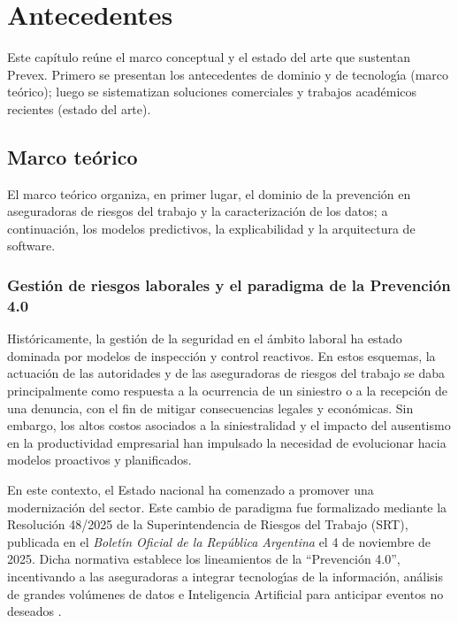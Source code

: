 \chapter{Antecedentes}\label{ch:antecedentes}\label{ch:marco-teorico}

Este cap\'itulo re\'une el marco conceptual y el estado del arte que sustentan Prevex. Primero se presentan los antecedentes de dominio y de tecnolog\'{\i}a (marco te\'orico); luego se sistematizan soluciones comerciales y trabajos acad\'emicos recientes (estado del arte).

\section{Marco te\'orico}\label{sec:marco-teorico}

El marco te\'orico organiza, en primer lugar, el dominio de la prevenci\'on en aseguradoras de riesgos del trabajo y la caracterizaci\'on de los datos; a continuaci\'on, los modelos predictivos, la explicabilidad y la arquitectura de software.

\subsection{Gesti\'on de riesgos laborales y el paradigma de la Prevenci\'on 4.0}

Hist\'oricamente, la gesti\'on de la seguridad en el \'ambito laboral ha estado dominada por modelos de inspecci\'on y control reactivos. En estos esquemas, la actuaci\'on de las autoridades y de las aseguradoras de riesgos del trabajo se daba principalmente como respuesta a la ocurrencia de un siniestro o a la recepci\'on de una denuncia, con el fin de mitigar consecuencias legales y econ\'omicas. Sin embargo, los altos costos asociados a la siniestralidad y el impacto del ausentismo en la productividad empresarial han impulsado la necesidad de evolucionar hacia modelos proactivos y planificados.

En este contexto, el Estado nacional ha comenzado a promover una modernizaci\'on del sector. Este cambio de paradigma fue formalizado mediante la Resoluci\'on 48/2025 de la Superintendencia de Riesgos del Trabajo (SRT), publicada en el \emph{Bolet\'{\i}n Oficial de la Rep\'ublica Argentina} el 4 de noviembre de 2025. Dicha normativa establece los lineamientos de la ``Prevenci\'on 4.0'', incentivando a las aseguradoras a integrar tecnolog\'{\i}as de la informaci\'on, an\'alisis de grandes vol\'umenes de datos e Inteligencia Artificial para anticipar eventos no deseados \parencite{srt_res48_2025}.


